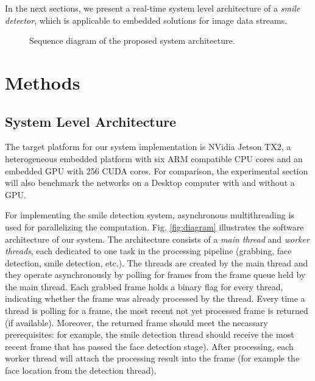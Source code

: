 \documentclass[conference]{IEEEtran}
\begin{document}
In the next sections, we present a real-time system level architecture of a \textit{smile detector}, which is applicable to embedded solutions for image data streams.%


\begin{figure*}
\vspace{1mm}
\caption{Sequence diagram of the proposed system architecture.}\label{fig:sequence}
\end{figure*}


\section{Methods}

\subsection{System Level Architecture}

The target platform for our system implementation is NVidia Jetson TX2, a heterogeneous embedded platform with six ARM compatible CPU cores and an embedded GPU with 256 CUDA cores. For comparison, the experimental section will also benchmark the networks on a Desktop computer with and without a GPU.

For implementing the smile detection system, asynchronous multithreading is used for parallelizing the computation.
Fig. \ref{fig:diagram} illustrates the software architecture of our system. %
The architecture consists of a \textit{main thread} and \textit{worker threads}, each dedicated to one task in the processing pipeline (grabbing, face detection, smile detection, etc.). The threads are created by the main thread and they operate asynchronously by polling for frames from the frame queue held by the main thread. Each grabbed frame holds a binary flag for every thread, indicating whether the frame was already processed by the thread. Every time a thread is polling for a frame, the most recent not yet processed frame is returned (if available). Moreover, the returned frame should meet the necassary prerequisites: for example, the smile detection thread should receive the most recent frame that has passed the face detection stage). After processing, each worker thread will attach the processing result into the frame (for example the face location from the detection thread). 
\end{document}
